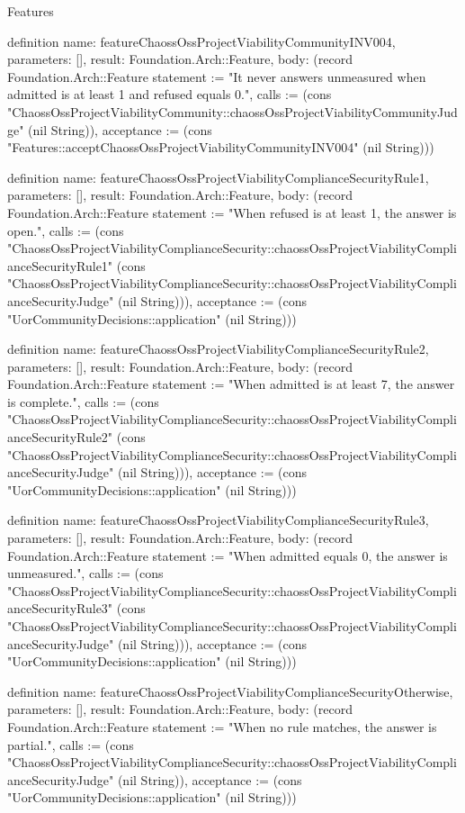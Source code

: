 \begin{lexlean}{Features}
\begin{semanticmodule}
definition{
  name: featureChaossOssProjectViabilityCommunityINV004,
  parameters: [],
  result: Foundation.Arch::Feature,
  body: (record Foundation.Arch::Feature {statement := "It never answers unmeasured when admitted is at least 1 and refused equals 0.", calls := (cons "ChaossOssProjectViabilityCommunity::chaossOssProjectViabilityCommunityJudge" (nil String)), acceptance := (cons "Features::acceptChaossOssProjectViabilityCommunityINV004" (nil String))})
}

definition{
  name: featureChaossOssProjectViabilityComplianceSecurityRule1,
  parameters: [],
  result: Foundation.Arch::Feature,
  body: (record Foundation.Arch::Feature {statement := "When refused is at least 1, the answer is open.", calls := (cons "ChaossOssProjectViabilityComplianceSecurity::chaossOssProjectViabilityComplianceSecurityRule1" (cons "ChaossOssProjectViabilityComplianceSecurity::chaossOssProjectViabilityComplianceSecurityJudge" (nil String))), acceptance := (cons "UorCommunityDecisions::application" (nil String))})
}

definition{
  name: featureChaossOssProjectViabilityComplianceSecurityRule2,
  parameters: [],
  result: Foundation.Arch::Feature,
  body: (record Foundation.Arch::Feature {statement := "When admitted is at least 7, the answer is complete.", calls := (cons "ChaossOssProjectViabilityComplianceSecurity::chaossOssProjectViabilityComplianceSecurityRule2" (cons "ChaossOssProjectViabilityComplianceSecurity::chaossOssProjectViabilityComplianceSecurityJudge" (nil String))), acceptance := (cons "UorCommunityDecisions::application" (nil String))})
}

definition{
  name: featureChaossOssProjectViabilityComplianceSecurityRule3,
  parameters: [],
  result: Foundation.Arch::Feature,
  body: (record Foundation.Arch::Feature {statement := "When admitted equals 0, the answer is unmeasured.", calls := (cons "ChaossOssProjectViabilityComplianceSecurity::chaossOssProjectViabilityComplianceSecurityRule3" (cons "ChaossOssProjectViabilityComplianceSecurity::chaossOssProjectViabilityComplianceSecurityJudge" (nil String))), acceptance := (cons "UorCommunityDecisions::application" (nil String))})
}

definition{
  name: featureChaossOssProjectViabilityComplianceSecurityOtherwise,
  parameters: [],
  result: Foundation.Arch::Feature,
  body: (record Foundation.Arch::Feature {statement := "When no rule matches, the answer is partial.", calls := (cons "ChaossOssProjectViabilityComplianceSecurity::chaossOssProjectViabilityComplianceSecurityJudge" (nil String)), acceptance := (cons "UorCommunityDecisions::application" (nil String))})
}


\end{semanticmodule}
\end{lexlean}
